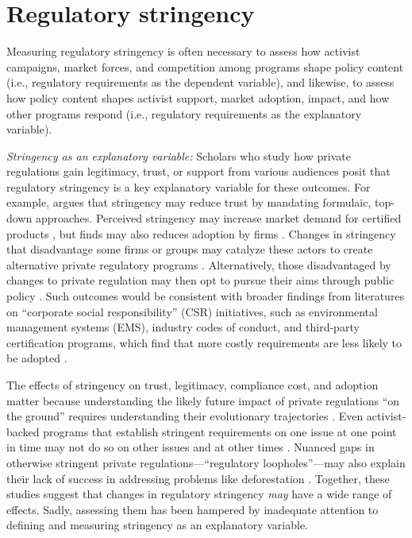 \documentclass[
      12pt,
            Review ]{article}
\begin{document}
\section{Regulatory stringency}\label{regulatory-stringency}

Measuring regulatory stringency is often necessary to assess how
activist campaigns, market forces, and competition among programs shape
policy content (i.e., regulatory requirements as the dependent
variable), and likewise, to assess how policy content shapes activist
support, market adoption, impact, and how other programs respond (i.e.,
regulatory requirements as the explanatory variable).

\emph{Stringency as an explanatory variable:} Scholars who study how
private regulations gain legitimacy, trust, or support from various
audiences posit that regulatory stringency is a key explanatory variable
for these outcomes. For example, \citet{McDermott2012} argues that
stringency may reduce trust by mandating formulaic, top-down approaches.
Perceived stringency may increase market demand for certified products
\citep{Atkinson2014}, but finds may also reduces adoption by firms
\citep{Prado2013}. Changes in stringency that disadvantage some firms or
groups may catalyze these actors to create alternative private
regulatory programs \citep{Meidinger2003}. Alternatively, those
disadvantaged by changes to private regulation may then opt to pursue
their aims through public policy \citep{Weimer2006}. Such outcomes would
be consistent with broader findings from literatures on ``corporate
social responsibility'' (CSR) initiatives, such as environmental
management systems (EMS), industry codes of conduct, and third-party
certification programs, which find that more costly requirements are
less likely to be adopted \citep{Delmas2008, Kollman2001, Lyon2008}.

The effects of stringency on trust, legitimacy, compliance cost, and
adoption matter because understanding the likely future impact of
private regulations ``on the ground'' requires understanding their
evolutionary trajectories \citep{VanderVen2018}. Even activist-backed
programs that establish stringent requirements on one issue at one point
in time may not do so on other issues and at other times
\citep{LeBaron2018}. Nuanced gaps in otherwise stringent private
regulations---``regulatory loopholes''---may also explain their lack of
success in addressing problems like deforestation \citep{VanderVen2018}.
Together, these studies suggest that changes in regulatory stringency
\emph{may} have a wide range of effects. Sadly, assessing them has been
hampered by inadequate attention to defining and measuring stringency as
an explanatory variable.
\end{document}
